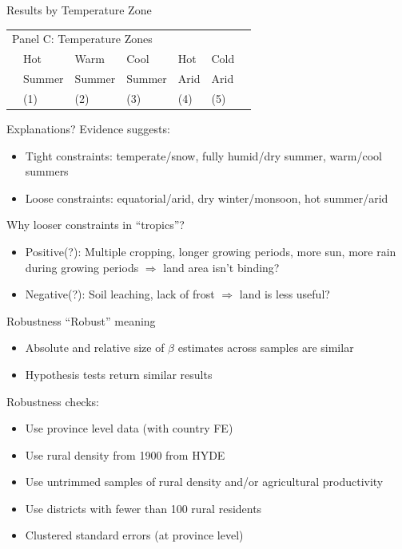 \documentclass[10pt, xcolor=dvipsnames]{beamer}
\begin{document}
\begin{frame}{Results by Temperature Zone}

{\scriptsize
\begin{tabularx}{\textwidth}{lXXXXXX}
\midrule
\multicolumn{7}{l}{Panel C: Temperature Zones} \\
    & Hot        & Warm        & Cool       & Hot      & Cold     &  \\
    & Summer & Summer  & Summer & Arid & Arid &   \\
 & (1) & (2) & (3) & (4) & (5) &  \\    
\midrule

\midrule
\end{tabularx}
}

\end{frame}

\begin{frame}{Explanations?}
Evidence suggests:
\begin{itemize}
  \item Tight constraints: temperate/snow, fully humid/dry summer, warm/cool summers
  \item Loose constraints: equatorial/arid, dry winter/monsoon, hot summer/arid
\end{itemize}

\vspace{.2cm} Why looser constraints in ``tropics''?
\begin{itemize}
  \item Positive(?): Multiple cropping, longer growing periods, more sun, more rain during growing periods $\Rightarrow$ land area isn't binding?
  \item Negative(?): Soil leaching, lack of frost $\Rightarrow$ land is less useful?
\end{itemize}
\end{frame}


\begin{frame}{Robustness}\label{robustness}
``Robust'' meaning
\begin{itemize}
  \item Absolute and relative size of $\beta$ estimates across samples are similar
  \item Hypothesis tests return similar results
\end{itemize}
Robustness checks:
\begin{itemize}
  \item Use province level data (with country FE) \hyperlink{regprov}{}
  \item Use rural density from 1900 from HYDE \hyperlink{reg1900}{}
  \item Use untrimmed samples of rural density and/or agricultural productivity
  \item Use districts with fewer than 100 rural residents
  \item Clustered standard errors (at province level)
\end{itemize}
\end{frame}
\end{document}

